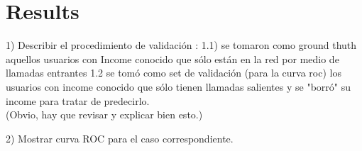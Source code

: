 \section{Results}

1) Describir el procedimiento de validación :
1.1) se tomaron como ground thuth aquellos usuarios con Income conocido que sólo están en la red por medio de llamadas entrantes
1.2 se tomó como set de validación (para la curva roc)  los usuarios con income conocido que sólo tienen llamadas salientes y se "borró" su income para tratar de predecirlo. \\

(Obvio, hay que revisar y explicar bien esto.)

2) Mostrar curva ROC para el caso correspondiente.
